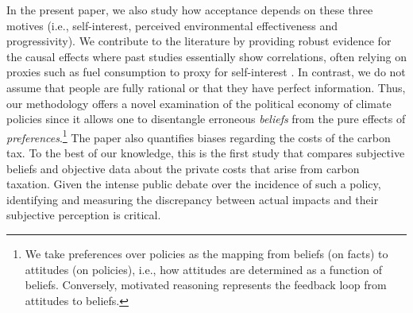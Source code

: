 \documentclass[12pt]{article} %
\begin{document}
In the present paper, we also study how acceptance depends on these three motives (i.e., self-interest, perceived environmental effectiveness and progressivity). We contribute to the literature by providing robust evidence for the causal effects where past studies essentially show correlations, often relying on proxies such as fuel consumption to proxy for self-interest \citep[e.g.,][]{thalmann_public_2004,kallbekken_saelen_2011,anderson_can_2019}. In contrast, we do not assume that people are fully rational or that they have perfect information. Thus, our methodology offers a novel examination of the political economy of climate policies since it allows one to disentangle erroneous \emph{beliefs} from the pure effects of \emph{preferences}.\footnote{We take preferences over policies as the mapping from beliefs (on facts) to attitudes (on policies), i.e., how attitudes are determined as a function of beliefs. Conversely, motivated reasoning represents the feedback loop from attitudes to beliefs.} The paper also quantifies biases regarding the costs of the carbon tax. To the best of our knowledge, this is the first study that compares subjective beliefs and objective data about the private costs that arise from carbon taxation. Given the intense public debate over the incidence of such a policy, identifying and measuring the discrepancy between actual impacts and their subjective perception is critical.
\end{document}
